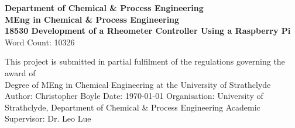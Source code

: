 \documentclass[twoside,a4]{report}
\def\atitle{Development of a Rheometer Controller Using a Raspberry Pi}
\def\thewords{10326} %
\begin{document}
	\begin{titlepage}
		\centering
		\vskip3cm
		{
			\bfseries\Large
			Department of Chemical \& Process Engineering\\
			\vskip1cm
			MEng in Chemical \& Process Engineering\\
			18530
			\vskip3cm
			\LARGE\atitle
		}
		\vskip3cm
		{\small Word Count: \thewords}
		\vskip1cm
		\begin{flushleft}
			This project is submitted in partial fulfilment of the regulations governing the award of \\
			Degree of MEng in Chemical Engineering at the University of Strathclyde
			\vskip2cm
			Author: Christopher Boyle \hfill Date: \today \newline
			\vskip1cm
			Organisation: University of Strathclyde, Department of Chemical \& Process Engineering \newline
			Academic Supervisor: Dr. Leo Lue
		\end{flushleft}
	\end{titlepage}
\end{document}
